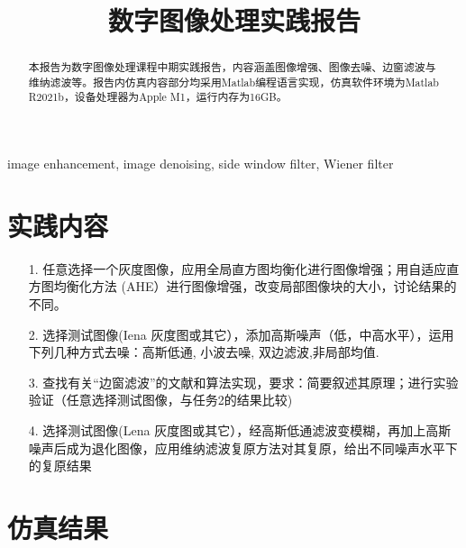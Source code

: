 \documentclass[conference]{IEEEtran}
\begin{document}
\title{数字图像处理实践报告}

\author{
}

\maketitle

\begin{abstract}
本报告为数字图像处理课程中期实践报告，内容涵盖图像增强、图像去噪、边窗滤波与维纳滤波等。报告内仿真内容部分均采用Matlab编程语言实现，仿真软件环境为Matlab R2021b，设备处理器为Apple M1，运行内存为16GB。
\end{abstract}

\begin{IEEEkeywords}
    image enhancement, image denoising, side window filter, Wiener filter
\end{IEEEkeywords}

\section{实践内容}
\begin{itemize}
    \item[1.] 任意选择一个灰度图像，应用全局直方图均衡化进行图像增强；用自适应直方图均衡化方法 (AHE）进行图像增强，改变局部图像块的大小，讨论结果的不同。
    \item[2.]选择测试图像(Iena 灰度图或其它），添加高斯噪声（低，中高水平），运用下列几种方式去噪：高斯低通, 小波去噪, 双边滤波,非局部均值.
    \item[3.] 查找有关“边窗滤波”的文献和算法实现，要求：简要叙述其原理；进行实验验证（任意选择测试图像，与任务2的结果比较) 
    \item[4.] 选择测试图像(Lena 灰度图或其它），经高斯低通滤波变模糊，再加上高斯噪声后成为退化图像，应用维纳滤波复原方法对其复原，给出不同噪声水平下的复原结果 
\end{itemize}

\section{仿真结果}
\end{document}
